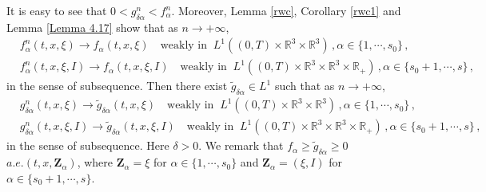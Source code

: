 \documentclass[reqno,11pt]{amsart}
\numberwithin{equation}{section}
\def\R{\mathbb{R}}
\begin{document}
It is easy to see that $0 < g^n_{\delta \alpha} < f^n_\alpha $. Moreover, Lemma \ref{rwc}, Corollary \ref{rwc1} and Lemma \ref{Lemma 4.17} show that as $n \to + \infty$,
\begin{equation*}
  \begin{aligned}
    & f^n_\alpha (t, x, \xi) \to f_\alpha (t, x, \xi) \quad \textrm{weakly in } \ L^1 ( (0, T) \times \R^3 \times \R^3 ) \,, \alpha \in \{ 1, \cdots, s_0 \} \,, \\
    & f^n_\alpha (t, x, \xi, I) \to f_\alpha (t, x, \xi, I) \quad \textrm{weakly in } \ L^1 ( (0, T) \times \R^3 \times \R^3 \times \R_+ ) \,, \alpha \in \{ s_0 + 1, \cdots, s \} \,,
  \end{aligned}
\end{equation*}
in the sense of subsequence. Then there exist $\tilde{g}_{\delta \alpha} \in L^1$ such that as $n \to + \infty$,
\begin{equation*}
  \begin{aligned}
    & g^n_{\delta \alpha} (t, x, \xi) \to \tilde{g}_{\delta \alpha} (t, x, \xi) \quad \textrm{weakly in } \ L^1 ( (0, T) \times \R^3 \times \R^3 ) \,, \alpha \in \{ 1, \cdots, s_0 \} \,, \\
    & g^n_{\delta \alpha} (t, x, \xi, I) \to \tilde{g}_{\delta \alpha} (t, x, \xi, I) \quad \textrm{weakly in } \ L^1 ( (0, T) \times \R^3 \times \R^3 \times \R_+ ) \,, \alpha \in \{ s_0 + 1, \cdots, s \} \,,
  \end{aligned}
\end{equation*}
in the sense of subsequence. Here $\delta > 0$. We remark that $f_\alpha \geq \tilde{g}_{\delta \alpha} \geq 0$ $a. e. (t,x, \mathbf{Z}_\alpha)$, where $\mathbf{Z}_\alpha = \xi$ for $\alpha \in \{ 1, \cdots, s_0 \}$ and $\mathbf{Z}_\alpha = (\xi, I)$ for $\alpha \in \{ s_0 + 1, \cdots, s \}$.
\end{document}
